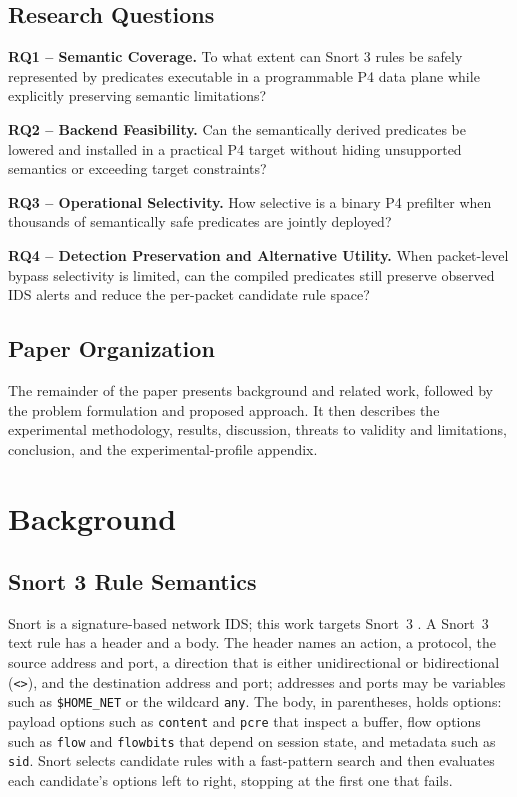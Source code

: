 \documentclass{article}
\begin{document}
\subsection{Research Questions}
\textbf{RQ1 -- Semantic Coverage.} To what extent can Snort 3 rules be
safely represented by predicates executable in a programmable P4 data
plane while explicitly preserving semantic limitations?

\textbf{RQ2 -- Backend Feasibility.} Can the semantically derived
predicates be lowered and installed in a practical P4 target without
hiding unsupported semantics or exceeding target constraints?

\textbf{RQ3 -- Operational Selectivity.} How selective is a binary P4
prefilter when thousands of semantically safe predicates are jointly deployed?

\textbf{RQ4 -- Detection Preservation and Alternative Utility.} When
packet-level bypass selectivity is limited, can the compiled predicates
still preserve observed IDS alerts and reduce the per-packet candidate
rule space?

\subsection{Paper Organization}
The remainder of the paper presents background and related work, followed by
the problem formulation and proposed approach. It then describes the
experimental methodology, results, discussion, threats to validity and
limitations, conclusion, and the experimental-profile appendix.

\section{Background}
\label{sec:background}
\subsection{Snort 3 Rule Semantics}
Snort \cite{roesch1999snort} is a signature-based network IDS; this work
targets Snort~3 \cite{snort3manual}. A Snort~3 text rule has a header and a
body. The header names an action, a protocol, the source address and port, a
direction that is either unidirectional or bidirectional (\texttt{<>}), and
the destination address and port; addresses and ports may be variables such
as \texttt{\$HOME\_NET} or the wildcard \texttt{any}. The body, in
parentheses, holds options: payload options such as \texttt{content} and
\texttt{pcre} that inspect a buffer, flow options such as \texttt{flow} and
\texttt{flowbits} that depend on session state, and metadata such as
\texttt{sid}. Snort selects candidate rules with a fast-pattern search and
then evaluates each candidate's options left to right, stopping at the first
one that fails.
\end{document}
